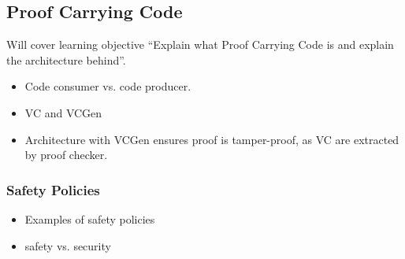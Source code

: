 \subsection{Proof Carrying Code}
\label{subsec:proof_carrying_code}

Will cover learning objective ``Explain what Proof Carrying Code is and explain the architecture behind''.

\begin{itemize}
\item 
Code consumer vs. code producer.
\item VC and VCGen
  \item Architecture with VCGen ensures proof is tamper-proof, as VC are extracted by proof checker.
\end{itemize}




\subsubsection{Safety Policies}
\label{subsec:safety_policies}
\begin{itemize}
\item Examples of safety policies
\item safety vs. security
\end{itemize}


